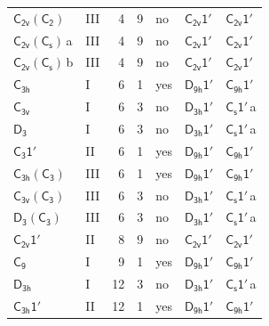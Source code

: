 \documentclass[10pt,a4paper]{article}
\numberwithin{equation}{section}
\newcommand{\grp}[1]{\mathsf{#1}}
\newcommand{\clsletter}[1]{\,{\scriptsize\color{black!55}#1}}
\begin{document}
{\begin{longtable}{@{}llrrlll@{}}
\href{C2v-C2.pdf}{$\grp{C_{2v}}(\grp{C_{2}})$} & III & 4 & 9 & no & \href{C2v-1p.pdf}{$\grp{C_{2v}1'}$} & \href{C2v-1p.pdf}{$\grp{C_{2v}1'}$}\\
\href{C2v-C1v.pdf}{$\grp{C_{2v}}(\grp{C_{s}})$}\clsletter{a} & III & 4 & 9 & no & \href{C2v-1p.pdf}{$\grp{C_{2v}1'}$} & \href{C2v-1p.pdf}{$\grp{C_{2v}1'}$}\\
\href{C2v-C1v.pdf}{$\grp{C_{2v}}(\grp{C_{s}})$}\clsletter{b} & III & 4 & 9 & no & \href{C2v-1p.pdf}{$\grp{C_{2v}1'}$} & \href{C2v-1p.pdf}{$\grp{C_{2v}1'}$}\\
\href{../../../rotation/data/pdf/C3h.pdf}{$\grp{C_{3h}}$} & I & 6 & 1 & yes & \href{D9h-1p.pdf}{$\grp{D_{9h}1'}$} & \href{C9h-1p.pdf}{$\grp{C_{9h}1'}$}\\
\href{../../../rotation/data/pdf/C3v.pdf}{$\grp{C_{3v}}$} & I & 6 & 3 & no & \href{D3h-1p.pdf}{$\grp{D_{3h}1'}$} & \href{C1v-1p.pdf}{$\grp{C_{s}1'}$}\clsletter{a}\\
\href{../../../rotation/data/pdf/D3.pdf}{$\grp{D_{3}}$} & I & 6 & 3 & no & \href{D3h-1p.pdf}{$\grp{D_{3h}1'}$} & \href{C1v-1p.pdf}{$\grp{C_{s}1'}$}\clsletter{a}\\
\href{C3-1p.pdf}{$\grp{C_{3}1'}$} & II & 6 & 1 & yes & \href{D9h-1p.pdf}{$\grp{D_{9h}1'}$} & \href{C9h-1p.pdf}{$\grp{C_{9h}1'}$}\\
\href{C3h-C3.pdf}{$\grp{C_{3h}}(\grp{C_{3}})$} & III & 6 & 1 & yes & \href{D9h-1p.pdf}{$\grp{D_{9h}1'}$} & \href{C9h-1p.pdf}{$\grp{C_{9h}1'}$}\\
\href{C3v-C3.pdf}{$\grp{C_{3v}}(\grp{C_{3}})$} & III & 6 & 3 & no & \href{D3h-1p.pdf}{$\grp{D_{3h}1'}$} & \href{C1v-1p.pdf}{$\grp{C_{s}1'}$}\clsletter{a}\\
\href{D3-C3.pdf}{$\grp{D_{3}}(\grp{C_{3}})$} & III & 6 & 3 & no & \href{D3h-1p.pdf}{$\grp{D_{3h}1'}$} & \href{C1v-1p.pdf}{$\grp{C_{s}1'}$}\clsletter{a}\\
\href{C2v-1p.pdf}{$\grp{C_{2v}1'}$} & II & 8 & 9 & no & \href{C2v-1p.pdf}{$\grp{C_{2v}1'}$} & \href{C2v-1p.pdf}{$\grp{C_{2v}1'}$}\\
\href{../../../rotation/data/pdf/C9.pdf}{$\grp{C_{9}}$} & I & 9 & 1 & yes & \href{D9h-1p.pdf}{$\grp{D_{9h}1'}$} & \href{C9h-1p.pdf}{$\grp{C_{9h}1'}$}\\
\href{../../../rotation/data/pdf/D3h.pdf}{$\grp{D_{3h}}$} & I & 12 & 3 & no & \href{D3h-1p.pdf}{$\grp{D_{3h}1'}$} & \href{C1v-1p.pdf}{$\grp{C_{s}1'}$}\clsletter{a}\\
\href{C3h-1p.pdf}{$\grp{C_{3h}1'}$} & II & 12 & 1 & yes & \href{D9h-1p.pdf}{$\grp{D_{9h}1'}$} & \href{C9h-1p.pdf}{$\grp{C_{9h}1'}$}\\

\end{longtable}}
\end{document}

